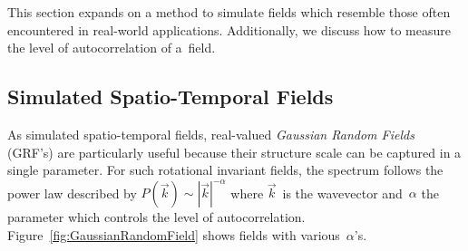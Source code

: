 \documentclass[ijgi,article,submit,moreauthors,pdftex,10pt,a4paper]{Definitions/mdpi}
\begin{document}


This section expands on a method to simulate fields which resemble those often encountered in real-world applications. Additionally, we discuss how to measure the level of autocorrelation of a~field.

\subsection{Simulated Spatio-Temporal Fields}
\label{sec:Materials and Methods/Simulated Spatio-Temporal Fields}

As simulated spatio-temporal fields, real-valued \textit{Gaussian Random Fields} (GRF's) are particularly useful because their structure scale can be captured in a single parameter. For such rotational invariant fields, the spectrum follows the power law described by $P(\vec{k}) \sim |\vec{k}|^{-\alpha}$ where $\vec{k} \,$ is the wavevector and~$\alpha$ the parameter which controls the level of autocorrelation. Figure~\ref{fig:GaussianRandomField} shows fields with various~$\alpha$'s.
\end{document}
